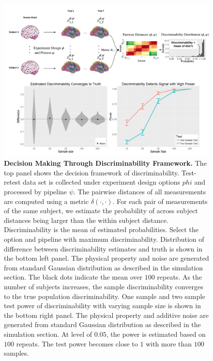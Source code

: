 \documentclass{article}
\begin{document}
\begin{figure}[H]
	\includegraphics[width=\linewidth]{../Figs/flow_simu.png}
	\caption{{\bf Decision Making Through Discriminability Framework.} The top panel shows the decision framework of discriminability. Test-retest data set is collected under experiment design options $phi$ and processed by pipeline $\psi$. The pairwise distances of all measurements are computed using a metric $\delta(\cdot,\cdot)$. For each pair of measurements of the same subject, we estimate the probability of across subject distances being larger than the within subject distance. Discriminability is the mean of estimated probabilities. Select the option and pipeline with maximum discriminability. 
	 Distribution of difference between discriminability estimates and truth is shown in the bottom left panel. The physical property and noise are generated from standard Gaussian distribution as described in the simulation section. The black dots indicate the mean over $100$ repeats. As the number of subjects increases, the sample discriminability converges to the true population discriminability.
	 One sample and two sample test power of discriminability with varying sample size is shown in the bottom right panel. The physical property and additive noise are generated from standard Gaussian distribution as described in the simulation section. At level of $0.05$, the power is estimated based on $100$ repeats. The test power becomes close to $1$ with more than $100$ samples.}
	\label{fig:fc}
\end{figure}
\end{document}
